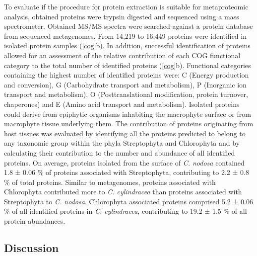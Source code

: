 \documentclass[
  12pt,
]{article}
\begin{document}
To evaluate if the procedure for protein extraction is suitable for
metaproteomic analysis, obtained proteins were trypsin digested and
sequenced using a mass spectrometer. Obtained MS/MS spectra were
searched against a protein database from sequenced metagenomes. From
14,219 to 16,449 proteins were identified in isolated protein samples
(\autoref{cog}b). In addition, successful identification of proteins
allowed for an assessment of the relative contribution of each COG
functional category to the total number of identified proteins
(\autoref{cog}b). Functional categories containing the highest number of
identified proteins were: C (Energy production and conversion), G
(Carbohydrate transport and metabolism), P (Inorganic ion transport and
metabolism), O (Posttranslational modification, protein turnover,
chaperones) and E (Amino acid transport and metabolism). Isolated
proteins could derive from epiphytic organisms inhabiting the macrophyte
surface or from macrophyte tissue underlying them. The contribution of
proteins originating from host tissues was evaluated by identifying all
the proteins predicted to belong to any taxonomic group within the phyla
Streptophyta and Chlorophyta and by calculating their contribution to
the number and abundance of all identified proteins. On average,
proteins isolated from the surface of \emph{C. nodosa} contained 1.8 ±
0.06 \si{\percent} of proteins associated with Streptophyta,
contributing to 2.2 ± 0.8 \si{\percent} of total proteins. Similar to
metagenomes, proteins associated with Chlorophyta contributed more to
\emph{C. cylindracea} than proteins associated with Streptophyta to
\emph{C. nodosa}. Chlorophyta associated proteins comprised 5.2 ± 0.06
\si{\percent} of all identified proteins in \emph{C. cylindracea},
contributing to 19.2 ± 1.5 \si{\percent} of all protein abundances.

\hypertarget{discussion}{%
\subsection{Discussion}\label{discussion}}
\end{document}
